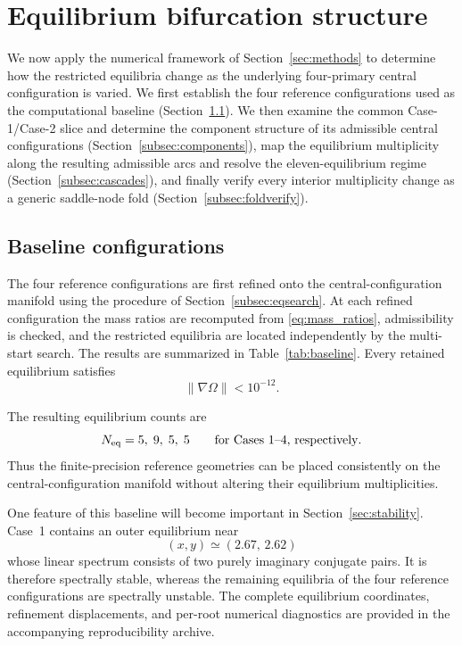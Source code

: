 \section{Equilibrium bifurcation structure}
\label{sec:results}

We now apply the numerical framework of Section~\ref{sec:methods} to determine how the
restricted equilibria change as the underlying four-primary central
configuration is varied. We first establish the four reference
configurations used as the computational baseline (Section~\ref{subsec:verification}). We then
examine the common Case-1/Case-2 slice and determine the component structure
of its admissible central configurations (Section~\ref{subsec:components}), map the equilibrium
multiplicity along the resulting admissible arcs and resolve the
eleven-equilibrium regime (Section~\ref{subsec:cascades}), and finally verify every interior
multiplicity change as a generic saddle-node fold (Section~\ref{subsec:foldverify}).


\subsection{Baseline configurations}
\label{subsec:verification}

The four reference configurations are first refined onto the
central-configuration manifold using the procedure of Section~\ref{subsec:eqsearch}. At each
refined configuration the mass ratios are recomputed from
\eqref{eq:mass_ratios}, admissibility is checked, and the restricted
equilibria are located independently by the multi-start search. The results
are summarized in Table~\ref{tab:baseline}. Every retained equilibrium
satisfies
\[
\|\nabla\Omega\|<10^{-12}.
\]

The resulting equilibrium counts are
\begin{equation}
N_{\rm eq}=5,\;9,\;5,\;5
\qquad
\text{for Cases~1--4, respectively}.
\label{eq:baseline_counts}
\end{equation}
Thus the finite-precision reference geometries can be placed consistently
on the central-configuration manifold without altering their equilibrium
multiplicities.

One feature of this baseline will become important in Section~\ref{sec:stability}. Case~1
contains an outer equilibrium near
\[
(x,y)\simeq(2.67,\,2.62)
\]
whose linear spectrum consists of two purely imaginary conjugate pairs. It
is therefore spectrally stable, whereas the remaining equilibria of the
four reference configurations are spectrally unstable. The complete
equilibrium coordinates, refinement displacements, and per-root numerical
diagnostics are provided in the accompanying reproducibility archive.

